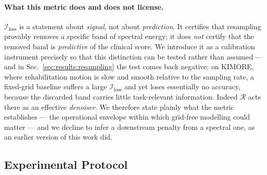 \paragraph{What this metric does and does not license.} $\mathcal{I}_{\text{loss}}$ is a statement
about \emph{signal}, not about \emph{prediction}. It certifies that resampling provably removes a
specific band of spectral energy; it does \emph{not} certify that the removed band is
\emph{predictive} of the clinical score. We introduce it as a calibration instrument precisely so that
this distinction can be tested rather than assumed --- and in Sec.~\ref{sec:results:resampling} the
test comes back negative: on KIMORE, where rehabilitation motion is slow and smooth relative to the
sampling rate, a fixed-grid baseline suffers a large $\mathcal{I}_{\text{loss}}$ and yet loses
essentially no accuracy, because the discarded band carries little task-relevant information. Indeed
$\mathcal{R}$ acts there as an effective \emph{denoiser}. We therefore state plainly what the metric
establishes --- the operational envelope within which grid-free modelling could matter --- and we
decline to infer a downstream penalty from a spectral one, as an earlier version of this work did.

\subsection{Experimental Protocol}
\label{sec:method:protocol}

